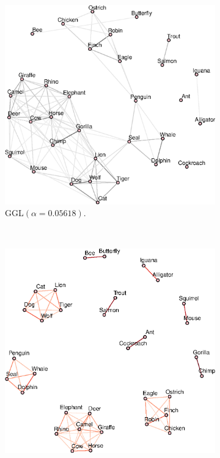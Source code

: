 \begin{figure}[!htb]
    \centering
    \begin{subfigure}[b]{0.475\textwidth}
      \includegraphics[width=\textwidth]{animals/latex/figures/animals_graph_ggl_alpha01.eps}
      \caption{\textsf{GGL}$(\alpha = 0.05618)$.}
    \end{subfigure}
    ~
    \begin{subfigure}[b]{0.475\textwidth}
      \includegraphics[width=\textwidth]{animals/latex/figures/animals_graph_k10.eps}

\end{subfigure}
\end{figure}
